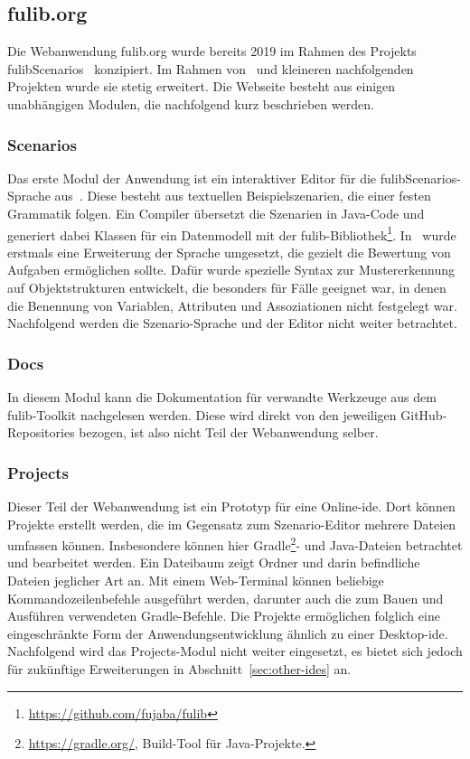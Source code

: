 \subsection{fulib.org}\label{subsec:fulib.org}

Die Webanwendung fulib.org wurde bereits 2019 im Rahmen des Projekts fulibScenarios~\cite{explain} konzipiert.
Im Rahmen von~\cite{bachelor-thesis} und kleineren nachfolgenden Projekten wurde sie stetig erweitert.
Die Webseite besteht aus einigen unabhängigen Modulen, die nachfolgend kurz beschrieben werden.

\subsubsection{Scenarios}
Das erste Modul der Anwendung ist ein interaktiver Editor für die fulibScenarios-Sprache aus~\cite{explain}.
Diese besteht aus textuellen Beispielszenarien, die einer festen Grammatik folgen.
Ein Compiler übersetzt die Szenarien in Java-Code und generiert dabei Klassen für ein Datenmodell mit der fulib-Bibliothek\footnote{\url{https://github.com/fujaba/fulib}}.
In~\cite{bachelor-thesis} wurde erstmals eine Erweiterung der Sprache umgesetzt, die gezielt die Bewertung von Aufgaben ermöglichen sollte.
Dafür wurde spezielle Syntax zur Mustererkennung auf Objektstrukturen entwickelt, die besonders für Fälle geeignet war, in denen die Benennung von Variablen, Attributen und Assoziationen nicht festgelegt war.
Nachfolgend werden die Szenario-Sprache und der Editor nicht weiter betrachtet.

\subsubsection{Docs}
In diesem Modul kann die Dokumentation für verwandte Werkzeuge aus dem fulib-Toolkit nachgelesen werden.
Diese wird direkt von den jeweiligen GitHub-Repositories bezogen, ist also nicht Teil der Webanwendung selber.

\subsubsection{Projects}
Dieser Teil der Webanwendung ist ein Prototyp für eine Online-\ac{ide}.
Dort können Projekte erstellt werden, die im Gegensatz zum Szenario-Editor mehrere Dateien umfassen können.
Insbesondere können hier Gradle\footnote{
    \url{https://gradle.org/}, Build-Tool für Java-Projekte.
}- und Java-Dateien betrachtet und bearbeitet werden.
Ein Dateibaum zeigt Ordner und darin befindliche Dateien jeglicher Art an.
Mit einem Web-Terminal können beliebige Kommandozeilenbefehle ausgeführt werden, darunter auch die zum Bauen und Ausführen verwendeten Gradle-Befehle.
Die Projekte ermöglichen folglich eine eingeschränkte Form der Anwendungsentwicklung ähnlich zu einer Desktop-\ac{ide}.
Nachfolgend wird das Projects-Modul nicht weiter eingesetzt, es bietet sich jedoch für zukünftige Erweiterungen in Abschnitt~\ref{sec:other-ides} an.

